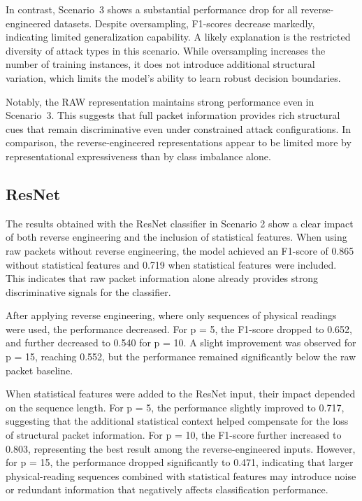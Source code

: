 In contrast, Scenario~3 shows a substantial performance drop for
all reverse-engineered datasets. Despite oversampling, F1-scores
decrease markedly, indicating limited generalization capability.
A likely explanation is the restricted diversity of attack types
in this scenario. While oversampling increases the number of
training instances, it does not introduce additional structural
variation, which limits the model’s ability to learn robust
decision boundaries.

Notably, the RAW representation maintains strong performance even
in Scenario~3. This suggests that full packet information provides
rich structural cues that remain discriminative even under
constrained attack configurations. In comparison, the
reverse-engineered representations appear to be limited more by
representational expressiveness than by class imbalance alone.

\subsection{ResNet}
The results obtained with the ResNet classifier in Scenario 2 show a clear impact of both reverse engineering and the inclusion of statistical features. When using raw packets without reverse engineering, the model achieved an F1-score of 0.865 without statistical features and 0.719 when statistical features were included. This indicates that raw packet information alone already provides strong discriminative signals for the classifier.

After applying reverse engineering, where only sequences of physical readings were used, the performance decreased. For p = 5, the F1-score dropped to 0.652, and further decreased to 0.540 for p = 10. A slight improvement was observed for p = 15, reaching 0.552, but the performance remained significantly below the raw packet baseline.

When statistical features were added to the ResNet input, their impact depended on the sequence length. For p = 5, the performance slightly improved to 0.717, suggesting that the additional statistical context helped compensate for the loss of structural packet information. For p = 10, the F1-score further increased to 0.803, representing the best result among the reverse-engineered inputs. However, for p = 15, the performance dropped significantly to 0.471, indicating that larger physical-reading sequences combined with statistical features may introduce noise or redundant information that negatively affects classification performance.

